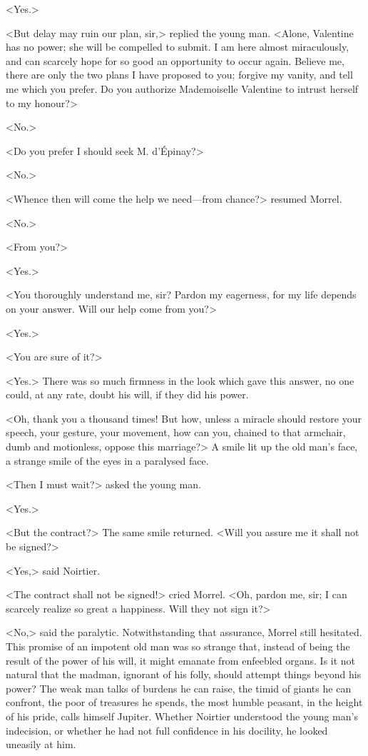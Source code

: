  <Yes.> 

 <But delay may ruin our plan, sir,> replied the young man. <Alone, Valentine has no power; she will be compelled to submit. I am here almost miraculously, and can scarcely hope for so good an opportunity to occur again. Believe me, there are only the two plans I have proposed to you; forgive my vanity, and tell me which you prefer. Do you authorize Mademoiselle Valentine to intrust herself to my honour?> 

 <No.> 

 <Do you prefer I should seek M. d'Épinay?> 

 <No.> 

 <Whence then will come the help we need—from chance?> resumed Morrel. 

 <No.> 

 <From you?> 

 <Yes.> 

 <You thoroughly understand me, sir? Pardon my eagerness, for my life depends on your answer. Will our help come from you?> 

 <Yes.> 

 <You are sure of it?> 

 <Yes.> There was so much firmness in the look which gave this answer, no one could, at any rate, doubt his will, if they did his power. 

 <Oh, thank you a thousand times! But how, unless a miracle should restore your speech, your gesture, your movement, how can you, chained to that armchair, dumb and motionless, oppose this marriage?> A smile lit up the old man's face, a strange smile of the eyes in a paralysed face. 

 <Then I must wait?> asked the young man. 

 <Yes.> 

 <But the contract?> The same smile returned. <Will you assure me it shall not be signed?> 

 <Yes,> said Noirtier. 

 <The contract shall not be signed!> cried Morrel. <Oh, pardon me, sir; I can scarcely realize so great a happiness. Will they not sign it?> 

 <No,> said the paralytic. Notwithstanding that assurance, Morrel still hesitated. This promise of an impotent old man was so strange that, instead of being the result of the power of his will, it might emanate from enfeebled organs. Is it not natural that the madman, ignorant of his folly, should attempt things beyond his power? The weak man talks of burdens he can raise, the timid of giants he can confront, the poor of treasures he spends, the most humble peasant, in the height of his pride, calls himself Jupiter. Whether Noirtier understood the young man's indecision, or whether he had not full confidence in his docility, he looked uneasily at him. 

